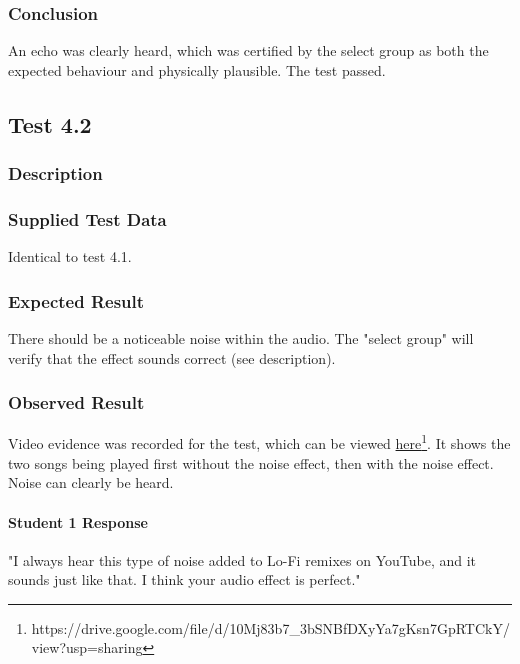 \subsubsection*{Conclusion}
An echo was clearly heard, which was certified by the select group as both the expected behaviour and physically plausible. The test passed.


\pagebreak
\subsection{Test 4.2}
\subsubsection*{Description}
\paragraph{}
{
	\centering
}

\subsubsection*{Supplied Test Data}
Identical to test 4.1.

\subsubsection*{Expected Result}
There should be a noticeable noise within the audio. The "select group" will verify that the effect sounds correct (see description).

\subsubsection*{Observed Result}
\label{sec:evidence4.2}
Video evidence was recorded for the test, which can be viewed \href{https://drive.google.com/file/d/10Mj83b7_3bSNBfDXyYa7gKsn7GpRTCkY/view?usp=sharing}{here}\footnote{
	https://drive.google.com/file/d/10Mj83b7\_3bSNBfDXyYa7gKsn7GpRTCkY/view?usp=sharing
}. It shows the two songs being played first without the noise effect, then with the noise effect. Noise can clearly be heard.

\paragraph{Student 1 Response}
"I always hear this type of noise added to Lo-Fi remixes on YouTube, and it sounds just like that. I think your audio effect is perfect."

